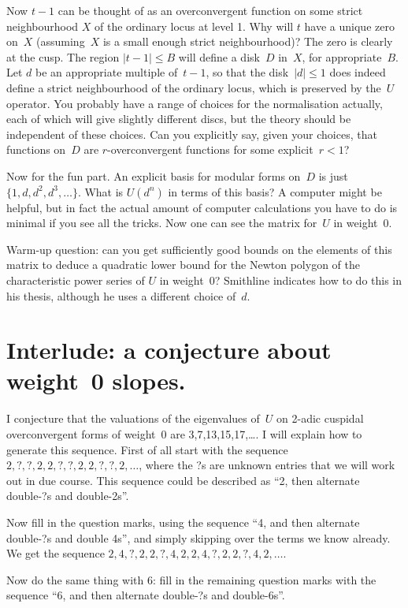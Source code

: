 \documentclass{article}
\begin{document}
Now $t-1$ can be thought of as an overconvergent function on some
strict neighbourhood $X$ of the ordinary locus at level 1. Why will $t$
have a unique zero on~$X$ (assuming~$X$ is a small enough strict
neighbourhood)?
The zero is clearly at the cusp. The region $|t-1|\leq B$ will define
a disk~$D$ in~$X$, for appropriate~$B$. Let $d$ be an appropriate
multiple of~$t-1$, so that
the disk~$|d|\leq1$ does indeed define a strict neighbourhood of
the ordinary locus, which is preserved by the~$U$ operator. You probably
have a range of choices for the normalisation actually, each of which
will give slightly different discs, but the theory should be independent
of these choices. Can you explicitly say, given your choices, that
functions on~$D$ are $r$-overconvergent functions for some explicit~$r<1$?

Now for the fun part. An explicit basis for modular forms on~$D$
is just $\{1,d,d^2,d^3,\ldots\}$. What is $U(d^n)$ in terms of
this basis? A computer might be helpful, but in fact the actual amount
of computer calculations you have to do is minimal if you see all the
tricks. Now one can see the matrix for~$U$ in weight~0.

Warm-up question: can you get sufficiently good bounds on the elements
of this matrix to deduce a quadratic lower bound for the Newton polygon
of the characteristic power series of $U$ in weight~0? Smithline indicates
how to do this in his thesis, although he uses a different choice of~$d$.

\section*{Interlude: a conjecture about weight~0 slopes.}

I conjecture that the valuations of the eigenvalues of~$U$ on 2-adic
cuspidal overconvergent forms of weight~0 are 3,7,13,15,17,\ldots. I will
explain how to generate this sequence. First of all start with
the sequence $2,?,?,2,2,?,?,2,2,?,?,2,\ldots$, where the ?s are
unknown entries that we will work out in due course. This sequence
could be described as ``2, then alternate double-?s and double-2s''.

Now fill in the question marks, using the sequence ``4, and then
alternate double-?s and double 4s'', and simply skipping over
the terms we know already. We get the sequence
$2,4,?,2,2,?,4,2,2,4,?,2,2,?,4,2,\ldots$.

Now do the same thing with 6: fill in the remaining question marks
with the sequence ``6, and then alternate double-?s and double-6s''.
\end{document}
